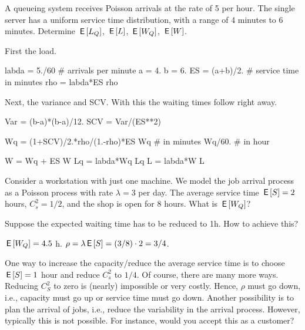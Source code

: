 \documentclass[companion]{subfiles}
\begin{document}
\begin{exercise}
 A queueing system receives Poisson arrivals at the rate of 5 per hour.
 The single server has a uniform service time distribution, with a range of 4 minutes to 6 minutes.
 Determine $\,\mathsf{E}\left[L_Q\right]$, $\,\mathsf{E}\left[L\right]$, $\,\mathsf{E}\left[W_Q\right]$, $\,\mathsf{E}\left[W\right]$.
\begin{solution}
First the load.
\begin{pyconsole}
labda = 5./60 # arrivals per minute
a = 4.
b = 6.
ES = (a+b)/2. # service time in minutes
rho = labda*ES
rho
\end{pyconsole}

Next, the variance and SCV. With this the waiting times follow right away.
\begin{pyconsole}
Var = (b-a)*(b-a)/12.
SCV = Var/(ES**2)


Wq = (1+SCV)/2.*rho/(1.-rho)*ES
Wq # in minutes
Wq/60. # in hour


W = Wq + ES
W
Lq = labda*Wq
Lq
L = labda*W
L
\end{pyconsole}
\end{solution}
\end{exercise}



\begin{exercise}
 Consider a workstation with just one machine.
 We model the job arrival process as a Poisson process with rate $\lambda=3$ per day.
 The average service time $\,\mathsf{E}\left[S\right] = 2$ hours, $C^2_s = 1/2$, and the shop is open for 8 hours.
 What is $\,\mathsf{E}\left[W_Q\right]$?

 Suppose the expected waiting time has to be reduced to 1h.
 How to achieve this?
\begin{solution}
 $\,\mathsf{E}\left[W_Q\right] = 4.5$ h. $\rho = \lambda \,\mathsf{E}\left[S\right] = (3/8)\cdot 2 = 3/4$.

 One way to increase the capacity/reduce the average service time is to choose $\,\mathsf{E}\left[S\right] =1$ hour and reduce $C^2_s$ to $1/4$.
 Of course, there are many more ways.
 Reducing $C^2_S$ to zero is (nearly) impossible or very costly.
 Hence, $\rho$ must go down, i.e., capacity must go up or service time must go down.
 Another possibility is to plan the arrival of jobs, i.e., reduce the variability in the arrival process.
 However, typically this is not possible.
 For instance, would you accept this as a customer?
\end{solution}
\end{exercise}
\end{document}
